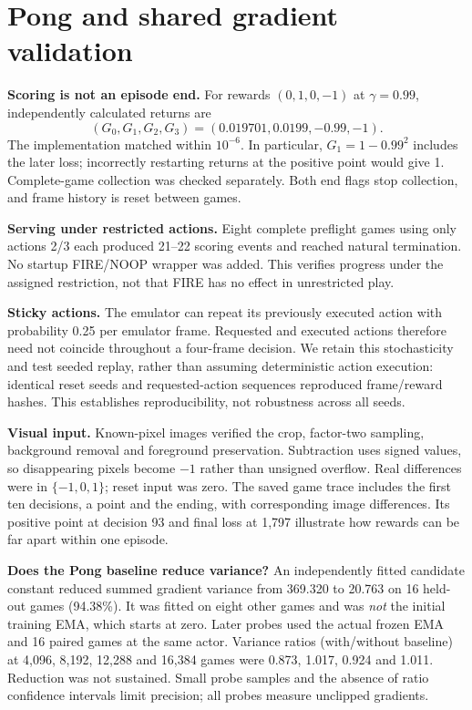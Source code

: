 \documentclass[11pt,letterpaper]{article}
\begin{document}
\clearpage
\section{Pong and shared gradient validation}\label{sec:pongvalidation}
\textbf{Scoring is not an episode end.} For rewards $(0,1,0,-1)$ at $\gamma=0.99$, independently calculated returns are
\[
(G_0,G_1,G_2,G_3)=(0.019701,0.0199,-0.99,-1).
\]
The implementation matched within $10^{-6}$. In particular, $G_1=1-0.99^2$ includes the later loss; incorrectly restarting returns at the positive point would give 1. Complete-game collection was checked separately. Both end flags stop collection, and frame history is reset between games.

\textbf{Serving under restricted actions.} Eight complete preflight games using only actions 2/3 each produced 21--22 scoring events and reached natural termination. No startup FIRE/NOOP wrapper was added. This verifies progress under the assigned restriction, not that FIRE has no effect in unrestricted play.

\textbf{Sticky actions.} The emulator can repeat its previously executed action with probability 0.25 per emulator frame. Requested and executed actions therefore need not coincide throughout a four-frame decision. We retain this stochasticity and test seeded replay, rather than assuming deterministic action execution: identical reset seeds and requested-action sequences reproduced frame/reward hashes. This establishes reproducibility, not robustness across all seeds.

\textbf{Visual input.} Known-pixel images verified the crop, factor-two sampling, background removal and foreground preservation. Subtraction uses signed values, so disappearing pixels become $-1$ rather than unsigned overflow. Real differences were in $\{-1,0,1\}$; reset input was zero. The saved game trace includes the first ten decisions, a point and the ending, with corresponding image differences. Its positive point at decision 93 and final loss at 1,797 illustrate how rewards can be far apart within one episode.

\textbf{Does the Pong baseline reduce variance?} An independently fitted candidate constant reduced summed gradient variance from 369.320 to 20.763 on 16 held-out games (94.38\%). It was fitted on eight other games and was \emph{not} the initial training EMA, which starts at zero. Later probes used the actual frozen EMA and 16 paired games at the same actor. Variance ratios (with/without baseline) at 4,096, 8,192, 12,288 and 16,384 games were 0.873, 1.017, 0.924 and 1.011. Reduction was not sustained. Small probe samples and the absence of ratio confidence intervals limit precision; all probes measure unclipped gradients.
\end{document}
